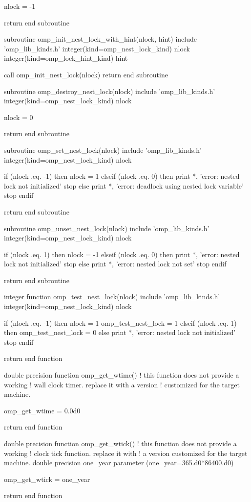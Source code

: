 {\begin{codepar}
  nlock = -1

  return
end subroutine

subroutine omp\_init\_nest\_lock\_with\_hint(nlock, hint)
  include 'omp\_lib\_kinds.h'
  integer(kind=omp\_nest\_lock\_kind) nlock
  integer(kind=omp\_lock\_hint\_kind) hint
  
  call omp\_init\_nest\_lock(nlock)
  return
end subroutine

subroutine omp\_destroy\_nest\_lock(nlock)
  include 'omp\_lib\_kinds.h'
  integer(kind=omp\_nest\_lock\_kind) nlock

  nlock = 0

  return
end subroutine

subroutine omp\_set\_nest\_lock(nlock)
  include 'omp\_lib\_kinds.h'
  integer(kind=omp\_nest\_lock\_kind) nlock

  if (nlock .eq. -1) then
    nlock = 1
  elseif (nlock .eq. 0) then
    print *, 'error: nested lock not initialized'
    stop
  else
    print *, 'error: deadlock using nested lock variable'
    stop
  endif

  return
end subroutine

subroutine omp\_unset\_nest\_lock(nlock)
  include 'omp\_lib\_kinds.h'
  integer(kind=omp\_nest\_lock\_kind) nlock

  if (nlock .eq. 1) then
    nlock = -1
  elseif (nlock .eq. 0) then
    print *, 'error: nested lock not initialized'
    stop
  else
    print *, 'error: nested lock not set'
    stop
  endif

  return
end subroutine

integer function omp\_test\_nest\_lock(nlock)
  include 'omp\_lib\_kinds.h'
  integer(kind=omp\_nest\_lock\_kind) nlock

  if (nlock .eq. -1) then
    nlock = 1
    omp\_test\_nest\_lock = 1
  elseif (nlock .eq. 1) then
    omp\_test\_nest\_lock = 0
  else
    print *, 'error: nested lock not initialized'
    stop
  endif

  return
end function

double precision function omp\_get\_wtime()
  ! this function does not provide a working
  ! wall clock timer. replace it with a version
  ! customized for the target machine.

  omp\_get\_wtime = 0.0d0

  return
end function

double precision function omp\_get\_wtick()
  ! this function does not provide a working
  ! clock tick function. replace it with
  ! a version customized for the target machine.
  double precision one\_year
  parameter (one\_year=365.d0*86400.d0)

  omp\_get\_wtick = one\_year

  return
end function
\end{codepar}} %


